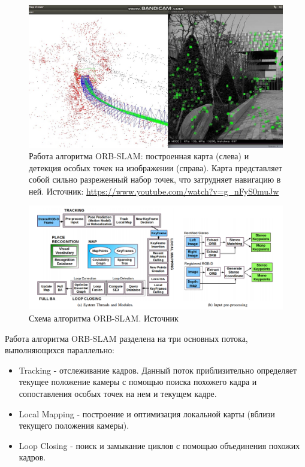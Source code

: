 \documentclass{mipt-thesis-ms}
\begin{document}
	\begin{figure}
		\includegraphics[width=1.0\textwidth]{img/orb_slam_map.jpg}
		\caption{Работа алгоритма ORB-SLAM: построенная карта (слева) и детекция особых точек на изображении (справа). Карта представляет собой сильно разреженный набор точек, что затрудняет навигацию в ней. Источник: \url{https://www.youtube.com/watch?v=g_nFyS0muJw}}
		\label{figure_orb_slam_map}
	\end{figure}

	\begin{figure}
		\includegraphics[width=1.0\textwidth]{img/orb_slam_scheme_high_resolution.png}
		\caption{Схема алгоритма ORB-SLAM. Источник \cite{mur2015orb}}
		\label{figure_orb_slam}
	\end{figure}
	
	Работа алгоритма ORB-SLAM разделена на три основных потока, выполняющихся параллельно:
	
	\begin{itemize}
		\item Tracking - отслеживание кадров. Данный поток приблизительно определяет текущее положение камеры с помощью поиска похожего кадра и сопоставления особых точек на нем и текущем кадре.
		\item Local Mapping - построение и оптимизация локальной карты (вблизи текущего положения камеры).
		\item Loop Closing - поиск и замыкание циклов с помощью объединения похожих кадров.
	\end{itemize}
\end{document}
